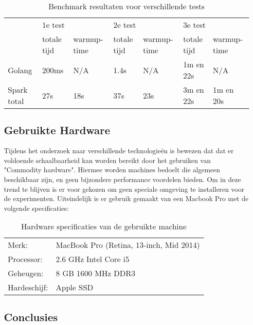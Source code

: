 \begin{table}[h]
\centering
\caption{Benchmark resultaten voor verschillende tests}
\label{tab:benchmarks}
\begin{tabular}{|l|l|l|l|l|l|l|}
\hline
\multirow{2}{*}{} & \multicolumn{2}{l|}{1e test} & \multicolumn{2}{l|}{2e test} & \multicolumn{2}{l|}{3e test} \\ \cline{2-7} 
                  & totale tijd   & warmup-time  & totale tijd   & warmup-time  & totale tijd   & warmup-time  \\ \hline
Golang            & 200ms         & N/A          & 1.4s          & N/A          & 1m en 22s     & N/A          \\ \hline
Spark total       & 27s           & 18s          & 37s           & 23s          & 3m en 22s     & 1m en 20s    \\ \hline
\end{tabular}
\end{table}

\clearpage

\subsection{Gebruikte Hardware}
\label{subsec:hardware_specs}

Tijdens het onderzoek naar verschillende technologieën is bewezen dat dat er voldoende schaalbaarheid kan worden bereikt door het gebruiken van "Commodity hardware". Hiermee worden machines bedoelt die algemeen beschikbaar zijn, en geen bijzondere performance voordelen bieden. Om in deze trend te blijven is er voor gekozen om geen speciale omgeving te installeren voor de experimenten. Uiteindelijk is er gebruik gemaakt van een Macbook Pro met de volgende specificaties:

\begin{table}[h]
\caption{Hardware specificaties van de gebruikte machine}
\label{tab:hardware_specs}
\begin{tabular}{ll}
Merk:      & MacBook Pro (Retina, 13-inch, Mid 2014) \\
Processor: & 2.6 GHz Intel Core i5                   \\
Geheugen:  & 8 GB 1600 MHz DDR3                      \\
Hardeschijf:   & Apple SSD                                  
\end{tabular}
\end{table}

\subsection{Conclusies}

